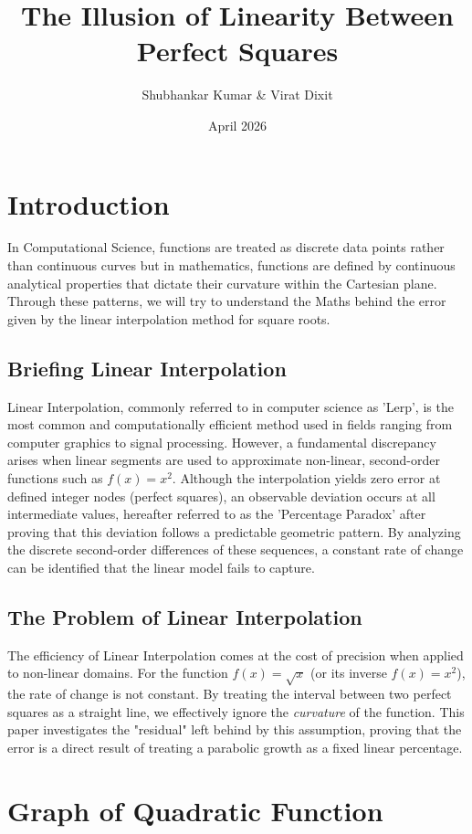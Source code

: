 \documentclass{article}
\title{The Illusion of Linearity Between Perfect Squares}
\author{Shubhankar Kumar \& Virat Dixit}
\date{April 2026}
\begin{document}
\maketitle
\section{Introduction}
In Computational Science, functions are treated as discrete data points rather than continuous curves but in mathematics, functions are defined by continuous analytical properties that dictate their curvature within the Cartesian plane. Through these patterns, we will try to understand the Maths behind the error given by the linear interpolation method for square roots.

\subsection{Briefing Linear Interpolation}
Linear Interpolation, commonly referred to in computer science as 'Lerp', is the most common and computationally efficient method used in fields ranging from computer graphics to signal processing. However, a fundamental discrepancy arises when linear segments are used to approximate non-linear, second-order functions such as $f(x) = x^2$. Although the interpolation yields zero error at defined integer nodes (perfect squares), an observable deviation occurs at all intermediate values, hereafter referred to as the 'Percentage Paradox' after proving that this deviation follows a predictable geometric pattern. By analyzing the discrete second-order differences of these sequences, a constant rate of change can be identified that the linear model fails to capture. 
\subsection{The Problem of Linear Interpolation}
The efficiency of Linear Interpolation comes at the cost of precision when applied to non-linear domains. For the function $f(x) = \sqrt{x}$ (or its inverse $f(x) = x^2$), the rate of change is not constant. By treating the interval between two perfect squares as a straight line, we effectively ignore the \textit{curvature} of the function. This paper investigates the "residual" left behind by this assumption, proving that the error is a direct result of treating a parabolic growth as a fixed linear percentage. 
\section{Graph of Quadratic Function}
\end{document}
